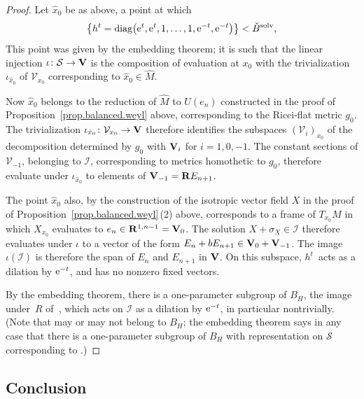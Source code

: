 \documentclass[10pt,a4paper]{amsart}
\numberwithin{equation}{section}
\theoremstyle{definition}
\newcommand{\BR}{{\bf R}}
\begin{document}
\begin{proof}
Let $\hat{x}_0$ be as above, a point at which
\[\bigl\{ h^t = {\rm diag}\bigl({\rm e}^t, {\rm e}^{t}, 1, \dots, 1, {\rm e}^{-t},{\rm e}^{-t}\bigr) \bigr\} < \check{B}^{\rm solv},\]
This point was given by the embedding theorem; it is such that the linear injection $\iota\colon \mathcal{S} \rightarrow {\bf V}$ is the composition of evaluation at $x_0$ with the trivialization $\iota_{\hat{x}_0}$ of $\mathcal{V}_{x_0}$ corresponding to $\hat{x}_0 \in \hat{M}$.

Now $\hat{x}_0$ belongs to the reduction of $\hat{M}$ to $U(e_n)$ constructed in the proof of Proposition~\ref{prop.balanced.weyl} above, corresponding to the Ricci-flat metric $g_0$. The trivialization $\iota_{\hat{x}_0}\colon \mathcal{V}_{x_0} \rightarrow {\bf V}$ therefore identifies the subspaces $(\mathcal{V}_i)_{x_0}$ of the decomposition determined by $g_0$ with ${\bf V}_i$ for $i=1,0,-1$.
The constant sections of $\mathcal{V}_{-1}$, belonging to $\mathcal{I}$, corresponding to metrics homothetic to $g_0$, therefore evaluate under $\iota_{\hat{x}_0}$ to elements of ${\bf V}_{-1} = \BR E_{n+1}$.

The point $\hat{x}_0$ also, by the construction of the isotropic vector field $X$ in the proof of Proposition~\ref{prop.balanced.weyl}\,(2) above, corresponds to a frame of $T_{x_0} M$ in which $X_{x_0}$ evaluates to $e_n \in \BR^{1,n-1} = {\bf V}_0$.
The solution $X + \sigma_X \in \mathcal{I}$ therefore evaluates under $\iota$ to a vector of the form $E_n + b E_{n+1} \in {\bf V}_0 + {\bf V}_{-1}$.
The image $\iota(\mathcal{I})$ is therefore the span of $E_n$ and $E_{n+1}$ in ${\bf V}$. On this subspace, $h^t$~acts as a dilation by ${\rm e}^{-t}$, and has no nonzero fixed vectors.

By the embedding theorem, there is a one-parameter subgroup of $B_H$, the image under~$R$ of~, which acts on $\mathcal{I}$ as a dilation by ${\rm e}^{-t}$, in particular nontrivially. (Note that  may or may not belong to $B_H$; the embedding theorem says in any case that there is a one-parameter subgroup of $B_H$ with representation on $\mathcal{S}$ corresponding to .)
\end{proof}

\subsection{Conclusion}
\end{document}
